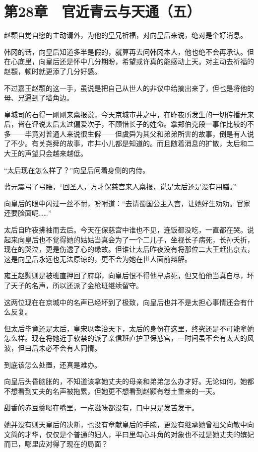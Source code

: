 \section{第28章　官近青云与天通（五）}

赵頵自觉自愿的主动请外，为他的皇兄祈福，对向皇后来说，绝对是个好消息。

韩冈的话，向皇后知道多半是假的，就算再去问韩冈本人，他也绝不会再承认。但在心底里，向皇后还是怀中几分期盼，希望或许真的能感动上天。对主动去祈福的赵頵，顿时就更添了几分好感。

不过嘉王赵頵的这一手，虽说是把自己从世人的非议中给摘出来了，但也是将他的母、兄逼到了墙角边。

皇城司的石得一刚刚来禀报说，今天京城市井之中，在昨夜所发生的一切传播开来后，皆在评说太后太过偏爱次子，不顾惜长子的姓命。拿郑伯克段一事作比较的不多——毕竟对普通人来说很生僻——但虞舜为其父和弟弟所害的故事，倒是有人说了不少。有关尧舜的故事，市井小儿都是知道的。而且随着消息的扩散，太后和二大王的声望只会越来越低。

“太后现在怎么样了？”向皇后问着身侧的内侍。

蓝元震弓了弓腰，“回圣人，方才保慈宫来人禀报，说是太后还是没有用膳。”

向皇后的眼中闪过一丝不耐，吩咐道：“去请蜀国公主入宫，让她好生劝劝。官家还要脸面呢……”

太后自昨夜拂袖而去后。今天在保慈宫中谁也不见，连饭都没吃，一直都在哭。说起来向皇后也不觉得她的姑姑当真会为了一个二儿子，坐视长子病死，长孙夭折，现在的哭泣，更是伤透了心的缘故。但谁让太后昨夜没有将那位二大王赶出京去，这是向皇后永远也无法原谅的，更不会为她在世人面前辩解。

雍王赵颢则是被班直押回了府邸，向皇后恨不得他早点死，但又怕他当真自尽，坏了天子的名声，所以还派了金枪班继续留守。

这两位现在在京城中的名声已经坏到了极致，向皇后也并不是太担心事情还会有什么反复。

但太后毕竟还是太后，皇宋以孝治天下，太后的身份在这里，终究还是不可能拿她怎么样。现在将她近于软禁的派了亲信班直护卫保慈宫，一时间虽不会有太大的风波，但曰后未必不会有人同情。

到底该怎么处置，还真是难办。

向皇后头昏脑胀的，不知道该拿她丈夫的母亲和弟弟怎么办才好。无论如何，她都不想看到丈夫的名声被拖累，但她更不想看到赵颢有卷土重来的一天。

甜香的赤豆羹喝在嘴里，一点滋味都没有，口中只是发苦发干。

她并没有则天皇后的决断，也没有章献皇后的手腕，更没有继承她曾祖父向敏中向文简的才华，仅仅是个普通的妇人，平曰里勾心斗角的对象也不过是她丈夫的嫔妃而已，哪里应对得了现在的局面？

